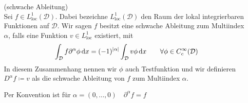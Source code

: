 \begin{Definition}(schwache Ableitung)\\
	Sei $f \in L_{\text{loc}}^1(\mathcal{D})$. Dabei bezeichne $  L_{\text{loc}}^1(\mathcal{D}) $ den Raum der lokal integrierbaren Funktionen auf $ \mathcal{D} $. Wir sagen $ f $ besitzt eine schwache Ableitung zum Multiindex $\alpha$, falls eine Funktion $v \in L_{\text{loc}}^1$ existiert, mit 
		\begin{align*}
			\int_{\mathcal{D}} f \partial^{\alpha} \phi \, \mathrm{d} x = (-1)^{|\alpha|} \int_{\mathcal{D}} v \phi \, \mathrm{d} x \qquad \forall \phi \in C_c^{\infty}(\mathcal{D})
		\end{align*}
	In diesem Zusammenhang nennen wir $\phi$ auch Testfunktion und wir definieren $D^{\alpha} f \coloneqq v$ als die schwache Ableitung von $f$ zum Multiindex $\alpha$. 
\end{Definition}
\begin{Bemerkung}
	Per Konvention ist für $ \alpha = (0,\dots, 0) \quad \partial^{\alpha}f = f $
\end{Bemerkung}
